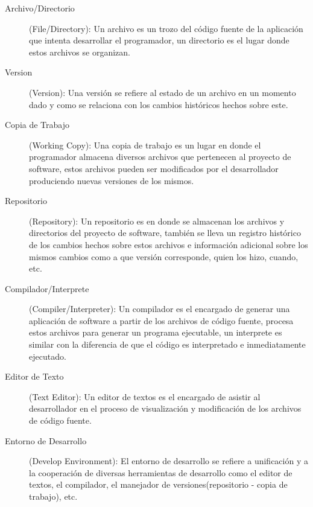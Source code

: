\begin{description}
	
	\item [Archivo/Directorio](File/Directory): \newline
	Un archivo es un trozo del código fuente de la aplicación que intenta desarrollar el programador, un directorio es el lugar donde estos archivos se organizan.
	
	\item [Version](Version): \newline
	Una versión se refiere al estado de un archivo en un momento dado y como se relaciona con los cambios históricos hechos sobre este.
	
	\item [Copia de Trabajo](Working Copy): \newline
	Una copia de trabajo es un lugar en donde el programador almacena diversos archivos que pertenecen al proyecto de software, estos archivos pueden ser modificados por el desarrollador produciendo nuevas versiones de los mismos.
	
	\item [Repositorio](Repository): \newline
	Un repositorio es en donde se almacenan los archivos y directorios del proyecto de software, también se lleva un registro histórico de los cambios hechos sobre estos archivos e información adicional sobre los mismos cambios como a que versión corresponde, quien los hizo, cuando, etc.
	
	\item [Compilador/Interprete](Compiler/Interpreter): \newline
	Un compilador es el encargado de generar una aplicación de software a partir de los archivos de código fuente, procesa estos archivos para generar un programa ejecutable, un interprete es similar con la diferencia de que el código es interpretado e inmediatamente ejecutado.
	
	\item [Editor de Texto](Text Editor): \newline
	Un editor de textos es el encargado de asistir al desarrollador en el proceso de visualización y modificación de los archivos de código fuente.
	
	\item [Entorno de Desarrollo](Develop Environment): \newline
	El entorno de desarrollo se refiere a unificación y a la cooperación de diversas herramientas de desarrollo como el editor de textos, el compilador, el manejador de versiones(repositorio - copia de trabajo), etc.
	

\end{description}
